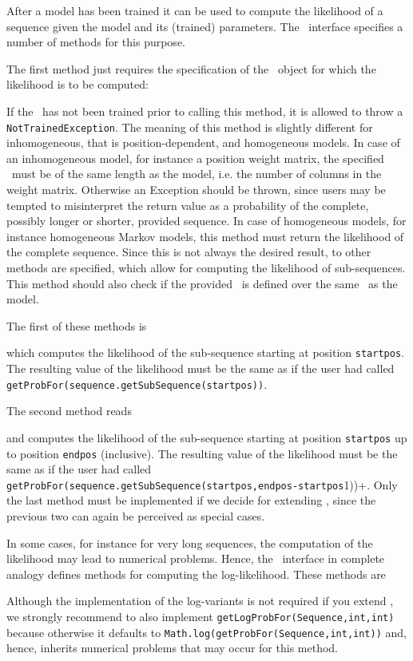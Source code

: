 After a model has been trained it can be used to compute the likelihood of a sequence given the model and its (trained) parameters. The \TrainSM~interface specifies a number of methods for this purpose.

The first method just requires the specification of the \Sequence~object for which the likelihood is to be computed:
\addtocounter{off}{24}
If the \TrainSM~has not been trained prior to calling this method, it is allowed to throw a \lstinline+NotTrainedException+. The meaning of this method is slightly different for inhomogeneous, that is position-dependent, and homogeneous models. In case of an inhomogeneous model, for instance a position weight matrix, the specified \Sequence~must be of the same length as the model, i.e. the number of columns in the weight matrix. Otherwise an Exception should be thrown, since users may be tempted to misinterpret the return value as a probability of the complete, possibly longer or shorter, provided sequence.
In case of homogeneous models, for instance homogeneous Markov models, this method must return the likelihood of the complete sequence. Since this is not always the desired result, to other methods are specified, which allow for computing the likelihood of sub-sequences. This method should also check if the provided \Sequence~is defined over the same \AlphabetContainer~as the model.

The first of these methods is
\addtocounter{off}{37}
which computes the likelihood of the sub-sequence starting at position \lstinline+startpos+. The resulting value of the likelihood must be the same as if the user had called \lstinline+getProbFor(sequence.getSubSequence(startpos))+.

The second method reads
\addtocounter{off}{40}
and computes the likelihood of the sub-sequence starting at position \lstinline+startpos+ up to position \lstinline+endpos+ (inclusive). The resulting value of the likelihood must be the same as if the user had called \lstinline+getProbFor(sequence.getSubSequence(startpos,endpos-startpos+1))+.
Only the last method must be implemented if we decide for extending \AbstractTrainSM, since the previous two can again be perceived as special cases.

In some cases, for instance for very long sequences, the computation of the likelihood may lead to numerical problems. Hence, the \TrainSM~interface in complete analogy defines methods for computing the log-likelihood. These methods are
\addtocounter{off}{32}
\addtocounter{off}{28}
\addtocounter{off}{28}
Although the implementation of the log-variants is not required if you extend \AbstractTrainSM, we strongly recommend to also implement \lstinline+getLogProbFor(Sequence,int,int)+ because otherwise it defaults to \lstinline+Math.log(getProbFor(Sequence,int,int))+ and, hence, inherits numerical problems that may occur for this method.

